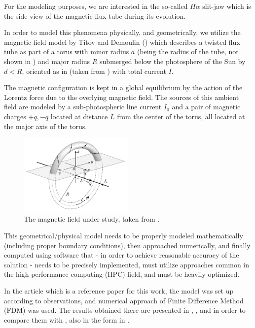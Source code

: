 For the modeling purposes, we are interested in the so-called $H\alpha$ slit-jaw which is the side-view of the magnetic flux tube during its evolution.

In order to model this phenomena physically, and geometrically, we utilize the magnetic field model by Titov and Demoulin (\cite{td}) which describes a twisted flux tube as part of a torus with minor radius $a$ (being the radius of the tube, not shown in ) and major radius $R$ submerged below the photosphere of the Sun by $d < R$, oriented as in  (taken from \cite{td}) with total current $I$.

The magnetic configuration is kept in a global equilibrium by the action of the Lorentz force due to the overlying magnetic field. The sources of this ambient field are modeled by a sub-photospheric line current $I_0$ and a pair of magnetic charges $+q, -q$ located at distance $L$ from the center of the torus, all located at the major axis of the torus.

\begin{figure}[H]
	\begin{center}
		\includegraphics[width=0.5\textwidth]{img/td-setup/fromTD.jpg}
	\caption{The magnetic field under study, taken from \cite{td}.}
	\label{figure:td}
	\end{center}
\end{figure}

This geometrical/physical model needs to be properly modeled mathematically (including proper boundary conditions), then approached numerically, and finally computed using software that - in order to achieve reasonable accuracy of the solution - needs to be precisely implemented, must utilize approaches common in the high performance computing (HPC) field, and must be heavily optimized.

In the article \cite{miraClanek} which is a reference paper for this work, the model was set up according to observations, and numerical approach of Finite Difference Method (FDM) was used. The results obtained there are presented in , , and in order to compare them with , also in the form in .

